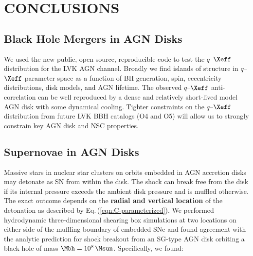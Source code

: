 \section{\MakeUppercase{conclusions}}
\label{sec:chapter-conclusions}



\subsection{Black Hole Mergers in AGN Disks}

We used the new public, open-source, reproducible code  to test the $q$--$\Xeff$ distribution for the LVK AGN channel.
Broadly we find islands of structure in $q$--$\Xeff$ parameter space as a function of BH generation, spin, eccentricity distributions, disk models, and AGN lifetime.
The observed $q$--$\Xeff$ anti-correlation can be well reproduced by a dense and relatively short-lived model AGN disk with some dynamical cooling.
Tighter constraints on the $q$--$\Xeff$ distribution from future LVK BBH catalogs (O4 and O5) will allow us to strongly constrain key AGN disk and NSC properties.

\subsection{Supernovae in AGN Disks}

Massive stars in nuclear star clusters on orbits embedded in AGN accretion disks may detonate as SN from 
within the disk.
The shock can break free from the disk if its internal pressure exceeds the ambient disk pressure and is muffled otherwise.
The exact outcome depends on the \textbf{radial and vertical location} of the detonation as described by Eq.\,(\ref{eqn:C-parameterized}).
We performed hydrodynamic three-dimensional shearing box simulations at two locations on either side of the muffling boundary of embedded SNe and found agreement with the analytic prediction for shock breakout from an SG-type AGN disk orbiting a black hole of mass $\Mbh=10^8\,\Msun$.
Specifically, we found:

